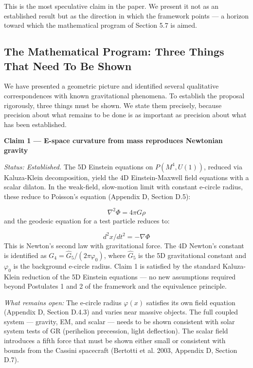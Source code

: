 \documentclass[aps,prd,preprint,superscriptaddress,longbibliography,floatfix]{revtex4-2}
\theoremstyle{remark}
\begin{document}
This is the most speculative claim in the paper. We present it not as an established result but as the direction in which the framework points --- a horizon toward which the mathematical program of Section 5.7 is aimed.



\subsection{The Mathematical Program: Three Things That Need To Be Shown}

We have presented a geometric picture and identified several qualitative correspondences with known gravitational phenomena. To establish the proposal rigorously, three things must be shown. We state them precisely, because precision about what remains to be done is as important as precision about what has been established.


\textbf{Claim 1 --- E-space curvature from mass reproduces Newtonian gravity}

\textit{Status: Established.} The 5D Einstein equations on $P(M^{4}, U(1))$, reduced via Kaluza-Klein decomposition, yield the 4D Einstein-Maxwell field equations with a scalar dilaton. In the weak-field, slow-motion limit with constant e-circle radius, these reduce to Poisson's equation (Appendix D, Section D.5):


\begin{equation}
    \nabla^{2}\Phi = 4\pi G\rho
\end{equation}
and the geodesic equation for a test particle reduces to:


\begin{equation}
    d^{2}x/dt^{2} = -\nabla\Phi
\end{equation}
This is Newton's second law with gravitational force. The 4D Newton's constant is identified as $G_{4} = \hat{G}_{5}/(2\pi\varphi_{0})$, where $\hat{G}_{5}$ is the 5D gravitational constant and $\varphi_{0}$ is the background e-circle radius. Claim 1 is satisfied by the standard Kaluza-Klein reduction of the 5D Einstein equations --- no new assumptions required beyond Postulates 1 and 2 of the framework and the equivalence principle.

\textit{What remains open:} The e-circle radius $\varphi(x)$ satisfies its own field equation (Appendix D, Section D.4.3) and varies near massive objects. The full coupled system --- gravity, EM, and scalar --- needs to be shown consistent with solar system tests of GR (perihelion precession, light deflection). The scalar field introduces a fifth force that must be shown either small or consistent with bounds from the Cassini spacecraft (Bertotti et al. 2003, Appendix D, Section D.7).
\end{document}

